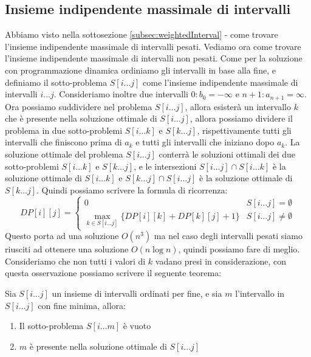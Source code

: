     \subsection{Insieme indipendente massimale di intervalli}
        Abbiamo visto nella sottosezione \ref{subsec:weightedInterval} -  come trovare l'insieme indipendente massimale di intervalli pesati. Vediamo ora come trovare l'insieme indipendente massimale di intervalli non pesati.
        Come per la soluzione con programmazione dinamica ordiniamo gli intervalli in base alla fine, e definiamo il sotto-problema $S[i\dots j]$ come l'insieme indipendente massimale di intervalli $i\dots j$. Consideriamo inoltre due intervalli $0: b_0=-\infty$ e $n+1: a_{n+1}=\infty$. Ora possiamo suddividere nel problema $S[i\dots j]$, allora esisterà un intervallo $k$ che è presente nella soluzione ottimale di $S[i\dots j]$, allora possiamo dividere il problema in due sotto-problemi $S[i\dots k]$ e $S[k\dots j]$, rispettivamente tutti gli intervalli che finiscono prima di $a_k$ e tutti gli intervalli che iniziano dopo $a_k$. La soluzione ottimale del problema $S[i\dots j]$ conterrà le soluzioni ottimali dei due sotto-problemi $S[i\dots k]$ e $S[k\dots j]$, e le intersezioni $S[i\dots j] \cap S[i\dots k]$ è la soluzione ottimale di $S[i\dots k]$ e $S[k\dots j]\cap S[i\dots j]$ è la soluzione ottimale di $S[k\dots j]$. Quindi possiamo scrivere la formula di ricorrenza:
        $$
            DP[i][j] = \begin{cases}
                0 & S[i\dots j] = \emptyset\\
                \max_{k\in S[i\dots j]}\{DP[i][k] + DP[k][j] + 1\} & S[i\dots j] \neq \emptyset
            \end{cases}
        $$
        Questo porta ad una soluzione $O(n^3)$ ma nel caso degli intervalli pesati siamo riusciti ad ottenere una soluzione $O(n\log n)$, quindi possiamo fare di meglio.\newline
        Consideriamo che non tutti i valori di $k$ vadano presi in considerazione, con questa osservazione possiamo scrivere il seguente teorema:
        \begin{theorem}
            Sia $S[i\dots j]$ un insieme di intervalli ordinati per fine, e sia $m$ l'intervallo in $S[i\dots j]$ con fine minima, allora:
            \begin{enumerate}
                \item Il sotto-problema $S[i\dots m]$ è vuoto
                \item $m$ è presente nella soluzione ottimale di $S[i\dots j]$
            \end{enumerate}
        \end{theorem}
